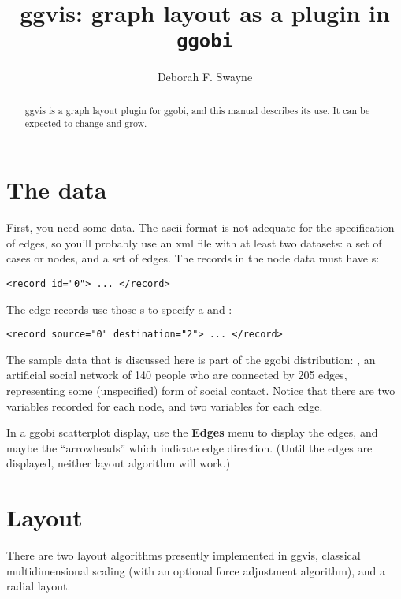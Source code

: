 \documentclass[11pt]{article}
\begin{document}
\title{ggvis: graph layout as a plugin in {\tt ggobi}}
\author{Deborah F. Swayne}
\date{}
\maketitle

\begin{abstract}
ggvis is a graph layout plugin for ggobi, and this manual
describes its use.  It can be expected to change and grow.
\end{abstract}

\section{The data}

First, you need some data.  The ascii format is not adequate
for the specification of edges, so you'll probably use an xml
file with at least two datasets:  a set of cases or nodes, and
a set of edges.  The records in the node data must have
s:

\begin{verbatim}
<record id="0"> ... </record>
\end{verbatim}

The edge records use those s to specify a
 and :

\begin{verbatim}
<record source="0" destination="2"> ... </record>
\end{verbatim}

The sample data that is discussed here is part of the ggobi distribution:
, an artificial social network of 140 people who are
connected by 205 edges, representing some (unspecified) form of social
contact.  Notice that there are two variables recorded for each node,
and two variables for each edge.

In a ggobi scatterplot display, use the {\bf Edges} menu to
display the edges, and maybe the ``arrowheads'' which indicate
edge direction.  (Until the edges are displayed, neither layout
algorithm will work.)

\section{Layout}

There are two layout algorithms presently implemented in ggvis,
classical multidimensional scaling (with an optional force
adjustment algorithm), and a radial layout.
\end{document}

